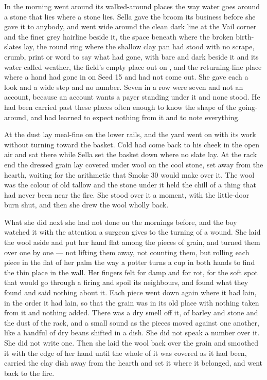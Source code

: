 In  the morning went around its walked-around places the way water goes around a stone that lies where a stone lies. Sella gave the broom its business before she gave it to anybody, and went wide around the clean dark line at the Vail corner and the finer grey hairline beside it, the space beneath  where the broken birth-slates lay, the round ring where the shallow clay pan had stood with no scrape, crumb, print or word to say what had gone,  with  bare and dark beside it and its water called weather, the field's empty place out on , and the returning-line place where a hand had gone in on Seed 15 and had not come out. She gave each a look and a wide step and no number. Seven in a row were seven and not an account, because an account wants a payer standing under it and none stood. He had been carried past these places often enough to know the shape of the going-around, and had learned to expect nothing from it and to note everything.

At  the dust lay meal-fine on the lower rails, and the yard went on with its work without turning toward the basket. Cold had come back to his cheek in the open air and sat there while Sella set the basket down where no slate lay. At the rack end the dressed grain lay covered under wool on the cool stone, set away from the hearth, waiting for the arithmetic that Smoke 30 would make over it. The wool was the colour of old tallow and the stone under it held the chill of a thing that had never been near the fire. She stood over it a moment, with the little-door burn shut, and then she drew the wool wholly back.

What she did next she had not done on the mornings before, and the boy watched it with the attention a surgeon gives to the turning of a wound. She laid the wool aside and put her hand flat among the pieces of grain, and turned them over one by one --- not lifting them away, not counting them, but rolling each piece in the flat of her palm the way a potter turns a cup in both hands to find the thin place in the wall. Her fingers felt for damp and for rot, for the soft spot that would go through a firing and spoil its neighbours, and found what they found and said nothing about it. Each piece went down again where it had lain, in the order it had lain, so that the grain was in its old place with nothing taken from it and nothing added. There was a dry smell off it, of barley and stone and the dust of the rack, and a small sound as the pieces moved against one another, like a handful of dry beans shifted in a dish. She did not speak a number over it. She did not write one. Then she laid the wool back over the grain and smoothed it with the edge of her hand until the whole of it was covered as it had been, carried the clay dish away from the hearth and set it where it belonged, and went back to the fire.

